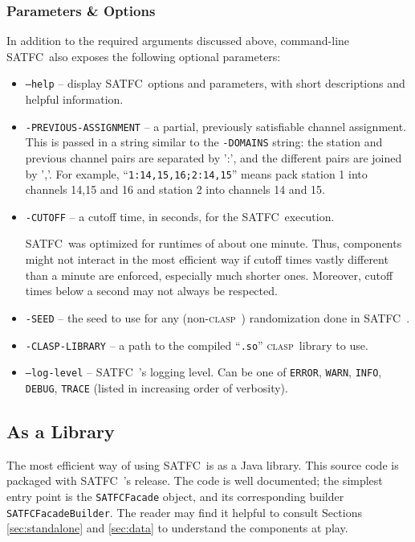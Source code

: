 \documentclass[
10pt, %
letterpaper, %
oneside, %
headinclude,footinclude, %
BCOR5mm, %
needspace, %
]{scrartcl}
\newcommand{\SATFC}{\textsc{SATFC}~}
\newcommand{\clasp}{\textsc{clasp}~}
\begin{document}
\subsubsection{Parameters \& Options}
In addition to the required arguments discussed above, command-line \SATFC also exposes the following optional parameters:
\begin{itemize}
\item \texttt{---help} -- display \SATFC options and parameters, with short descriptions and helpful information.
\item \texttt{-PREVIOUS-ASSIGNMENT} -- a partial, previously satisfiable channel assignment. This is passed in a string similar to the \texttt{-DOMAINS} string: the station and previous channel pairs are separated by ':', and the different pairs are joined by ','. For example, ``\texttt{1:14,15,16;2:14,15}'' means pack station 1 into channels 14,15 and 16 and station 2 into channels 14 and 15.
\item \texttt{-CUTOFF} -- a cutoff time, in seconds, for the \SATFC execution. 
\begin{fwarning}
\SATFC was optimized for runtimes of about one minute. Thus, components might not interact in the most efficient way if cutoff times vastly different than a minute are enforced, especially much shorter ones. Moreover, cutoff times below a second may not always be respected.
\end{fwarning}
\item \texttt{-SEED} -- the seed to use for any (non-\clasp) randomization done in \SATFC.
\item \texttt{-CLASP-LIBRARY} -- a path to the compiled ``\texttt{.so}'' \clasp library to use.
\item \texttt{---log-level} -- \SATFC's logging level. Can be one of \texttt{ERROR}, \texttt{WARN}, \texttt{INFO}, \texttt{DEBUG}, \texttt{TRACE} (listed in increasing order of verbosity).
\end{itemize}

\subsection{As a Library}

The most efficient way of using \SATFC is as a Java library. This source code is packaged with \SATFC's release. The code is well documented; the simplest entry point is the \texttt{SATFCFacade} object, and its corresponding builder \texttt{SATFCFacadeBuilder}. The reader may find it helpful to consult Sections \ref{sec:standalone} and \ref{sec:data} to understand the components at play.
\end{document}
